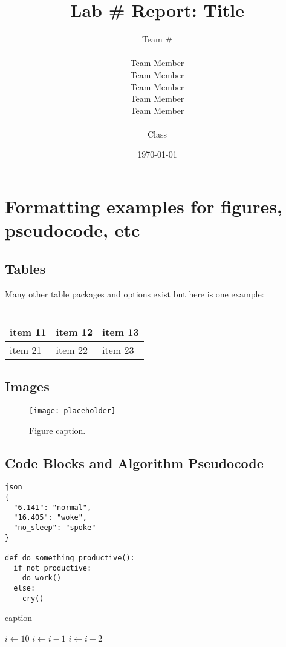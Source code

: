 \documentclass{lab}
\title{Lab \# Report: Title} %
\author{Team \# \\\\ Team Member \\ Team Member \\ Team Member \\ Team Member \\ Team Member \\\\ Class} %
\date{\today} %
\begin{document}
\maketitle

\newpage

\section{Formatting examples for figures, pseudocode, etc}

\subsection{Tables}

Many other table packages and options exist but here is one example:\\\\

\begin{tabularx}{0.8\textwidth} {
  | >{\raggedright\arraybackslash}X
  | >{\centering\arraybackslash}X
  | >{\raggedleft\arraybackslash}X | }
 \hline
 item 11 & item 12 & item 13 \\
 \hline
 item 21  & item 22  & item 23  \\
\hline
\end{tabularx}

\subsection{Images}

\begin{figure}[h]
\begin{center}
\texttt{[image: placeholder]} %
\caption{Figure caption.}
\end{center}
\end{figure}

\subsection{Code Blocks and Algorithm Pseudocode}


\begin{lstlisting}
json
{
  "6.141": "normal",
  "16.405": "woke",
  "no_sleep": "spoke"
}

def do_something_productive():
  if not_productive:
    do_work()
  else:
    cry()
\end{lstlisting}


\begin{algorithm}[H]
\SetAlgoLined
 \caption{caption}
\end{algorithm}


\begin{algorithmic}
\STATE $i\gets 10$
        \STATE $i\gets i-1$
\ELSE
                \STATE $i\gets i+2$
        \ENDIF
\ENDIF
\end{algorithmic}
\end{document}
